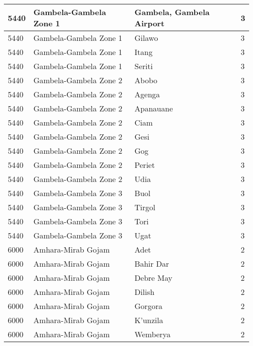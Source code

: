 \documentclass[12pt,a4paper,openbib,titlepage]{report}
\begin{document}
\begin{longtable}{|p{2cm}|p{6.5cm}|p{8cm}|p{1.5cm}|}
\hline 
\rule[-1ex]{0pt}{2.5ex} 5440 & Gambela-Gambela Zone 1 & Gambela, Gambela Airport & 3 \\
\hline 
\rule[-1ex]{0pt}{2.5ex} 5440 & Gambela-Gambela Zone 1 & Gilawo & 3 \\
\hline 
\rule[-1ex]{0pt}{2.5ex} 5440 & Gambela-Gambela Zone 1 & Itang & 3 \\
\hline 
\rule[-1ex]{0pt}{2.5ex} 5440 & Gambela-Gambela Zone 1 & Seriti & 3 \\
\hline 
\rule[-1ex]{0pt}{2.5ex} 5440 & Gambela-Gambela Zone 2 & Abobo & 3 \\
\hline 
\rule[-1ex]{0pt}{2.5ex} 5440 & Gambela-Gambela Zone 2 & Agenga & 3 \\
\hline 
\rule[-1ex]{0pt}{2.5ex} 5440 & Gambela-Gambela Zone 2 & Apanauane & 3 \\
\hline 
\rule[-1ex]{0pt}{2.5ex} 5440 & Gambela-Gambela Zone 2 & Ciam & 3 \\
\hline 
\rule[-1ex]{0pt}{2.5ex} 5440 & Gambela-Gambela Zone 2 & Gesi & 3 \\
\hline 
\rule[-1ex]{0pt}{2.5ex} 5440 & Gambela-Gambela Zone 2 & Gog & 3 \\
\hline 
\rule[-1ex]{0pt}{2.5ex} 5440 & Gambela-Gambela Zone 2 & Periet & 3 \\
\hline 
\rule[-1ex]{0pt}{2.5ex} 5440 & Gambela-Gambela Zone 2 & Udia & 3 \\
\hline 
\rule[-1ex]{0pt}{2.5ex} 5440 & Gambela-Gambela Zone 3 & Buol & 3 \\
\hline 
\rule[-1ex]{0pt}{2.5ex} 5440 & Gambela-Gambela Zone 3 & Tirgol & 3 \\
\hline 
\rule[-1ex]{0pt}{2.5ex} 5440 & Gambela-Gambela Zone 3 & Tori & 3 \\
\hline 
\rule[-1ex]{0pt}{2.5ex} 5440 & Gambela-Gambela Zone 3 & Ugat & 3 \\
\hline 
\rule[-1ex]{0pt}{2.5ex} 6000 & Amhara-Mirab Gojam & Adet & 2 \\
\hline 
\rule[-1ex]{0pt}{2.5ex} 6000 & Amhara-Mirab Gojam & Bahir Dar & 2 \\
\hline 
\rule[-1ex]{0pt}{2.5ex} 6000 & Amhara-Mirab Gojam & Debre May & 2 \\
\hline 
\rule[-1ex]{0pt}{2.5ex} 6000 & Amhara-Mirab Gojam & Dilish & 2 \\
\hline 
\rule[-1ex]{0pt}{2.5ex} 6000 & Amhara-Mirab Gojam & Gorgora & 2 \\
\hline 
\rule[-1ex]{0pt}{2.5ex} 6000 & Amhara-Mirab Gojam & K'unzila & 2 \\
\hline 
\rule[-1ex]{0pt}{2.5ex} 6000 & Amhara-Mirab Gojam & Wemberya & 2 \\

\end{longtable}
\end{document}
